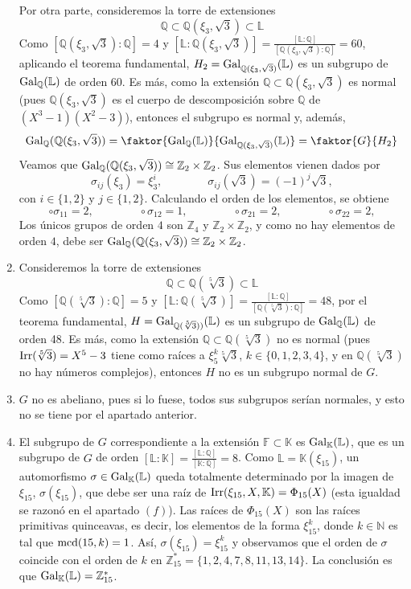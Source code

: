 \documentclass[11pt]{report}
\makeatletter
\renewenvironment{proof}[1][\proofname]{\par
  \pushQED{\qed}%
  \normalfont \topsep\z@skip %
  \trivlist
  \item[\hskip\labelsep
        \itshape
    #1\@addpunct{.}]\ignorespaces
}{%
  \popQED\endtrivlist\@endpefalse
}
\newcommand{\N}{\mathbb N}
\newcommand{\Z}{\mathbb Z}
\newcommand{\Q}{\mathbb Q}
\newcommand{\F}{\mathbb F}
\newcommand{\K}{\mathbb K}
\renewcommand{\L}{\mathbb L}
\makeatother
\begin{document}
\begin{proof}
\begin{enumerate}
    Por otra parte, consideremos la torre de extensiones
    \[\Q \subset \Q(\xi_3,\sqrt{3}) \subset \L\]
    Como $[\Q(\xi_3,\sqrt{3}) \colon \Q] = 4$ y $[\L \colon \Q(\xi_3,\sqrt{3})] = \frac{[\L \colon \Q]}{[\Q(\xi_3,\sqrt{3}) \colon \Q]} = 60$, aplicando el teorema fundamental, $ H_2=\textup{Gal}_{\Q(\xi_3,\sqrt{3})}(\L)$ es un subgrupo de $\textup{Gal}_\Q(\L)$ de orden 60. Es más, como la extensión $\Q \subset \Q(\xi_3,\sqrt{3})$ es normal (pues $\Q(\xi_3,\sqrt{3})$ es el cuerpo de descomposición sobre $\Q$ de $(X^3-1)(X^2-3)$), entonces el subgrupo es normal y, además,
    \[\textup{Gal}_\Q(\Q(\xi_3,\sqrt{3})) = \faktor{\textup{Gal}_\Q(\L)}{\textup{Gal}_{\Q(\xi_3,\sqrt{3})}(\L)} = \faktor{G}{H_2} \]
    Veamos que $\textup{Gal}_\Q(\Q(\xi_3,\sqrt{3})) \cong \Z_2 \times \Z_2$. Sus elementos vienen dados por 
    \[\sigma_{ij}(\xi_3) = \xi_3^i, \qquad \qquad \sigma_{ij}(\sqrt{3}) = (-1)^j\sqrt{3},\]
    con $i \in \{1,2\}$ y $j \in \{1,2\}$. Calculando el orden de los elementos, se obtiene
    \[\circ \sigma_{11} = 2, \qquad \qquad \circ \sigma_{12} = 1, \qquad \qquad\circ \sigma_{21} = 2, \qquad \qquad\circ \sigma_{22} = 2,\]
    Los únicos grupos de orden $4$ son $\Z_4$ y $\Z_2 \times \Z_2$, y como no hay elementos de orden $4$, debe ser $\textup{Gal}_\Q(\Q(\xi_3,\sqrt{3})) \cong \Z_2 \times \Z_2$.
    \item Consideremos la torre de extensiones
    \[\Q \subset \Q(\sqrt[5]{3}) \subset \L\]
    Como $[\Q(\sqrt[5]{3}) \colon \Q] = 5$ y $[\L \colon \Q(\sqrt[5]{3})] = \frac{[\L \colon \Q]}{[\Q(\sqrt[5]{3}) \colon \Q]} = 48$, por el teorema fundamental, $ H=\textup{Gal}_{\Q(\sqrt[5]{3}))}(\L)$ es un subgrupo de $\textup{Gal}_\Q(\L)$ de orden 48. Es más, como la extensión $\Q \subset \Q(\sqrt[5]{3})$ no es normal (pues $\textup{Irr}(\sqrt[5]{3}) = X^5-3$ tiene como raíces a $\xi_5^k\sqrt[5]{3}$, $k \in \{0,1,2,3,4\}$, y en $\Q(\sqrt[5]{3})$ no hay números complejos), entonces $H$ no es un subgrupo normal de $G$.
    \item $G$ no es abeliano, pues si lo fuese, todos sus subgrupos serían normales, y esto no se tiene por el apartado anterior.
    \item El subgrupo de $G$ correspondiente a la extensión $\F \subset \K$ es $\textup{Gal}_\K(\L)$, que es un subgrupo de $G$ de orden $[\L \colon \K] = \frac{[\L \colon \Q]}{[\K \colon \Q]} = 8$. Como $\L = \K(\xi_{15})$, un automorfismo $\sigma \in \textup{Gal}_\K(\L)$ queda totalmente determinado por la imagen de $\xi_{15}$, $\sigma(\xi_{15})$, que debe ser una raíz de $\textup{Irr}(\xi_{15},X,\K) = \Phi_{15}(X)$ (esta igualdad se razonó en el apartado $(f)$). Las raíces de $\Phi_{15}(X)$ son las raíces primitivas quinceavas, es decir, los elementos de la forma $\xi_{15}^k$, donde $k \in \N$ es tal que $\textup{mcd}(15,k) = 1$. Así, $\sigma(\xi_{15}) = \xi_{15}^k$ y observamos que el orden de $\sigma$ coincide con el orden de $k$ en $\Z_{15}^* = \{1,2,4,7,8,11,13,14\}$. La conclusión es que $\textup{Gal}_\K(\L)  =\Z_{15}^*$. \qedhere
\end{enumerate}
\end{proof}
\end{document}
